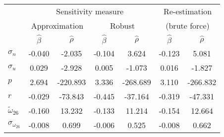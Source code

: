 \begin{tabular}{l*{6}{c}} \toprule 
& \multicolumn{4}{c}{Sensitivity measure} & \multicolumn{2}{c}{Re-estimation} \\ \cmidrule(lr){2-5}   
& \multicolumn{2}{c}{Approximation} & \multicolumn{2}{c}{Robust} & \multicolumn{2}{c}{(brute force)} \\ \cmidrule(lr){2-3} \cmidrule(lr){4-5} \cmidrule(lr){6-7}  
& $\hat{\beta}$ & $\hat{\rho}$ & $\hat{\beta}$ & $\hat{\rho}$ & $\hat{\beta}$ & $\hat{\rho}$ \\ \cmidrule(lr){2-7} 
  $\sigma_{n}$ & -0.040 & -2.035 & -0.104 & 3.624 & -0.123 & 5.081 \\ 
  $\sigma_{u}$ & 0.029 & -2.928 & 0.005 & -1.073 & 0.016 & -1.827 \\ 
  $p$ & 2.694 & -220.893 & 3.336 & -268.689 & 3.110 & -266.832 \\ 
  $r$ & -0.029 & -73.843 & -0.445 & -37.164 & -0.319 & -47.331 \\ 
  $\tilde{\omega}_{26}$ & -0.160 & 13.232 & -0.133 & 11.214 & -0.154 & 12.664 \\ 
  $\sigma_{\omega_{26}}$ & -0.008 & 0.699 & -0.006 & 0.525 & -0.008 & 0.662 \\ 
 \bottomrule 
 \end{tabular}